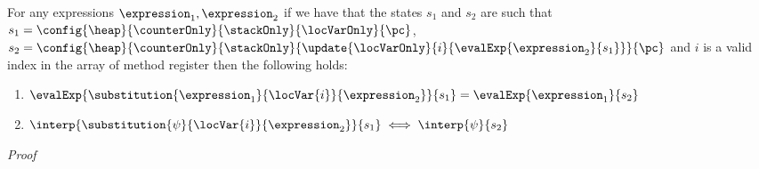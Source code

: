 \begin{substLv}\label{substLv}
For any expressions $ \expression_1, \expression_2 $ 
if we have that the states $s_1$ and $s_2$ are such that
$ s_1 =   \config{\heap}{\counterOnly}{ \stackOnly }{\locVarOnly}{\pc }$, %
$ s_2 =   \config{\heap}{\counterOnly }{ \stackOnly }{\update{\locVarOnly}{i}{ \evalExp{ \expression_2}{ s_1 } }}{\pc }  $
and $i$ is a valid index in the array of method register \locVarOnly{} then the following holds:
\begin{enumerate}
      \item $\evalExp{\substitution{\expression_1}{ \locVar{i} }{ \expression_2 }}{ s_1 } = \evalExp{\expression_1}{s_2} $
      \item $\interp{\substitution{\psi}{ \locVar{i} }{ \expression_2 }}{ s_1 } \iff \interp{\psi}{s_2} $
\end{enumerate}
\end{substLv}
\textit{Proof} 
